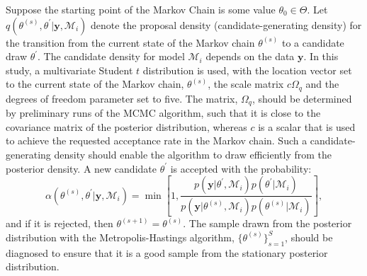 \documentclass[final,3p,authoryear]{elsarticle}
\begin{document}
Suppose the starting point of the Markov Chain is some value $\theta_0 \in \Theta$. Let $q(\theta^{(s)}, \theta^{\prime}|\mathbf{y}, \mathcal{M}_i)$ denote the proposal density (candidate-generating density) for the transition from the current state of the Markov chain $\theta^{(s)}$ to a candidate draw $\theta^{\prime}$. The candidate density for model $\mathcal{M}_i$ depends on the data $\mathbf{y}$. In this study, a multivariate Student $t$ distribution is used, with the location vector set to the current state of the Markov chain, $\theta^{(s)}$, the scale matrix $c\Omega_q$ and the degrees of freedom parameter set to five. The matrix, $\Omega_q$, should be determined by preliminary runs of the MCMC algorithm, such that it is close to the covariance matrix of the posterior distribution, whereas $c$ is a scalar that is used to achieve the requested acceptance rate in the Markov chain. Such a candidate-generating density should enable the algorithm to draw efficiently from the posterior density. A new candidate $\theta^{\prime}$ is accepted with the probability: 
\begin{equation}\label{eq:alpha}
\alpha(\theta^{(s)}, \theta^{\prime}|\mathbf{y},\mathcal{M}_i) = \min \left[ 1, \frac{p(\mathbf{y}|\theta^{\prime}, \mathcal{M}_i)p(\theta^{\prime}|\mathcal{M}_i)}{p(\mathbf{y}|\theta^{(s)}, \mathcal{M}_i)p(\theta^{(s)}|\mathcal{M}_i)} \right],
\end{equation}
and if it is rejected, then $\theta^{(s+1)} = \theta^{(s)}$. The sample drawn from the posterior distribution with the Metropolis-Hastings algorithm, $\{ \theta^{(s)}\}_{s=1}^{S}$, should be diagnosed to ensure that it is a good sample from the stationary posterior distribution.
\end{document}
